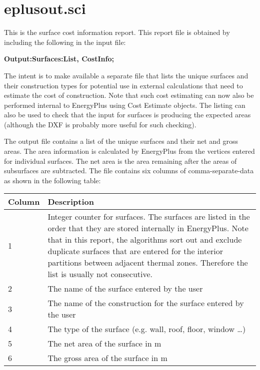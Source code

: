 \section{eplusout.sci}\label{eplusout.sci}

This is the surface cost information report. This report file is obtained by including the following in the input file:

\textbf{Output:Surfaces:List, CostInfo;}

The intent is to make available a separate file that lists the unique surfaces and their construction types for potential use in external calculations that need to estimate the cost of construction. Note that such cost estimating can now also be performed internal to EnergyPlus using Cost Estimate objects. The listing can also be used to check that the input for surfaces is producing the expected areas (although the DXF is probably more useful for such checking).

The output file contains a list of the unique surfaces and their net and gross areas. The area information is calculated by EnergyPlus from the vertices entered for individual surfaces. The net area is the area remaining after the areas of subsurfaces are subtracted. The file contains six columns of comma-separate-data as shown in the following table:

\begin{longtable}[c]{p{1.5in}p{4.5in}}
\toprule 
Column & Description \tabularnewline \midrule
\endhead
1 & Integer counter for surfaces. The surfaces are listed in the order that they are stored internally in EnergyPlus. Note that in this report, the algorithms sort out and exclude duplicate surfaces that are entered for the interior partitions between adjacent thermal zones. Therefore the list is usually not consecutive. \tabularnewline
2 & The name of the surface entered by the user \tabularnewline
3 & The name of the construction for the surface entered by the user \tabularnewline
4 & The type of the surface (e.g. wall, roof, floor, window …) \tabularnewline
5 & The net area of the surface in m \tabularnewline
6 & The gross area of the surface in m \tabularnewline
\bottomrule
\end{longtable}
